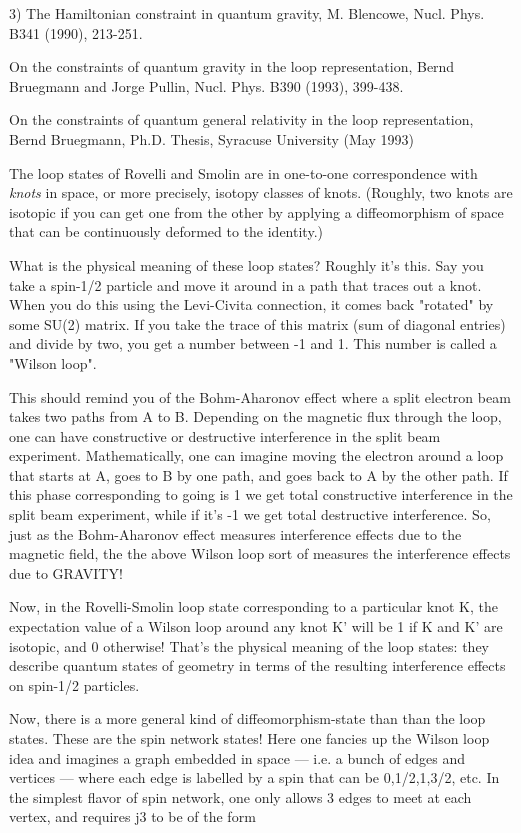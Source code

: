 3)  The Hamiltonian constraint in quantum gravity, M. Blencowe, Nucl. Phys. 
B341 (1990), 213-251.

On the constraints of quantum gravity in the loop representation,
Bernd Bruegmann and Jorge Pullin, Nucl. Phys. B390 (1993), 399-438.

On the constraints of quantum general relativity in the loop
representation, Bernd Bruegmann, Ph.D. Thesis, Syracuse University (May
1993) 


The loop states of Rovelli and Smolin are in one-to-one correspondence
with \emph{knots} in space, or more precisely, isotopy classes of knots.
(Roughly, two knots are isotopic if you can get one from the other by
applying a diffeomorphism of space that can be continuously deformed to
the identity.)

What is the physical meaning of these loop states?  Roughly it's this.
Say you take a spin-1/2 particle and move it around in a path that
traces out a knot.  When you do this using the Levi-Civita connection,
it comes back "rotated" by some SU(2) matrix.  If you take the trace of
this matrix (sum of diagonal entries) and divide by two, you get a
number between -1 and 1.  This number is called a "Wilson loop".

This should remind you of the Bohm-Aharonov effect where a split
electron beam takes two paths from A to B.  Depending on the magnetic
flux through the loop, one can have constructive or destructive
interference in the split beam experiment.  Mathematically, one can
imagine moving the electron around a loop that starts at A, goes to B by
one path, and goes back to A by the other path.  If this phase
corresponding to going is 1 we get total constructive interference in
the split beam experiment, while if it's -1 we get total destructive
interference.  So, just as the Bohm-Aharonov effect measures
interference effects due to the magnetic field, the the above Wilson
loop sort of measures the interference effects due to GRAVITY!

Now, in the Rovelli-Smolin loop state corresponding to a particular knot
K, the expectation value of a Wilson loop around any knot K' will be 1
if K and K' are isotopic, and 0 otherwise!  That's the physical meaning
of the loop states: they describe quantum states of geometry in terms of
the resulting interference effects on spin-1/2 particles.

Now, there is a more general kind of diffeomorphism-state than than the
loop states.  These are the spin network states!  Here one fancies up
the Wilson loop idea and imagines a graph embedded in space --- i.e. a
bunch of edges and vertices --- where each edge is labelled by a spin
that can be 0,1/2,1,3/2, etc.  In the simplest flavor of spin network,
one only allows 3 edges to meet at each vertex, and requires j3 to be of
the form

